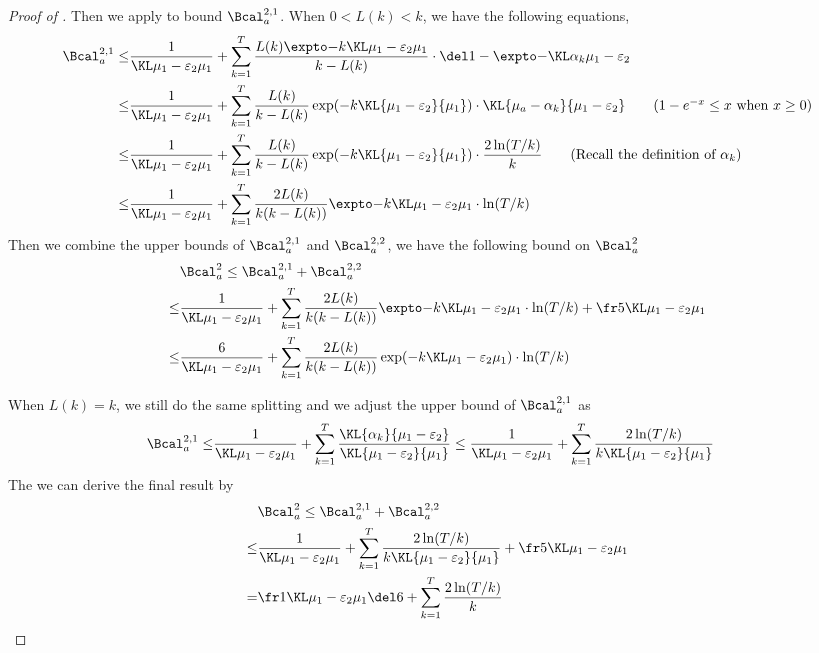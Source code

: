 \begin{proof}[Proof of ]
    Then we apply  to bound $\Bcal^{2,1}_a$.
    When $0 < L(k) < k$, we have the following equations,
    \begin{align*}
        \Bcal^{2,1}_{a}
        \leq& 
            \ExpFThreeOneA +
            \ExpFThreeOneB
        \\
        \leq&
            \ExpFThreeOneA +
            \sum_{k=1}^{T}
            \frac{L(k)}{k-L(k)}\exp(-k \KL{\mu_1-\varepsilon_2}{\mu_1})  
            \cdot
            \KL{\mu_a-\alpha_k}{\mu_1-\varepsilon_2}
                \tag{$1-e^{-x} \leq x$ when $x \geq 0$}
        \\
        \leq&
            \ExpFThreeOneA +
            \sum_{k=1}^{T}
            \frac{L(k)}{k-L(k)}\exp(-k \KL{\mu_1-\varepsilon_2}{\mu_1})  
            \cdot
            \frac{2\ln(T/k)}{k}
                \tag{Recall the definition of $\alpha_k$}
        \\
        \leq&
            \ExpFThreeOneMO
    \end{align*}
    Then we combine the upper bounds of $\Bcal^{2,1}_a$ and $\Bcal^{2,2}_a$, we have the following bound on $\Bcal_a^2$
    \begin{align*}
        & \Bcal^2_a \leq \Bcal^{2,1}_a + \Bcal^{2,2}_a
        \\
        \leq& \ExpFThreeOneMO + \ExpFThreeTwo
        \\
        \leq& \ExpFThreeMO
    \end{align*}
    
    When $L(k) = k$, we still do the same splitting and we adjust the upper bound of $\Bcal^{2,1}_a$ as
    \begin{align*}
        \Bcal^{2,1}_{a}
        \leq& \ExpFThreeOneA +
            \sum_{k=1}^{T}
            \frac{\KL{\alpha_k}{\mu_1 - \varepsilon_2}}{\KL{\mu_1 - \varepsilon_2}{\mu_1}}
        \leq
            \ExpFThreeOneA +
            \sum_{k=1}^{T}
            \frac{2\ln(T/k)}{k\KL{\mu_1 - \varepsilon_2}{\mu_1}}
    \end{align*}
    The we can derive the final result by
    \begin{align*}
        & \Bcal^2_a \leq \Bcal^{2,1}_a + \Bcal^{2,2}_a
        \\
        \leq& \ExpFThreeOneA +
            \sum_{k=1}^{T}
            \frac{2\ln(T/k)}{k\KL{\mu_1 - \varepsilon_2}{\mu_1}} + \ExpFThreeTwo
        \\
        =&
        \IdentityLBadCaseTwoMO
    \end{align*}
    
    \end{proof}
    
